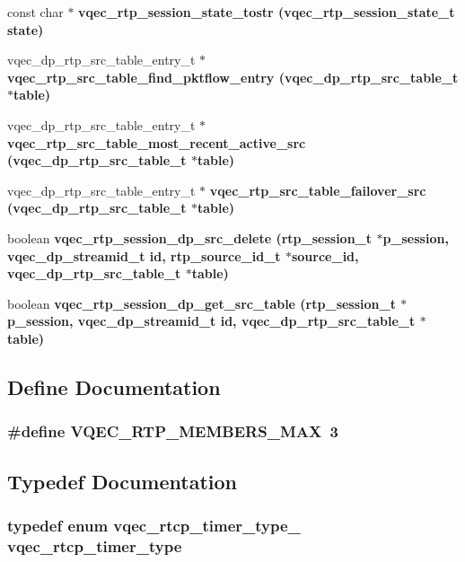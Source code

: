 \begin{CompactItemize}
const char $\ast$ \bf{vqec\_\-rtp\_\-session\_\-state\_\-tostr} (\bf{vqec\_\-rtp\_\-session\_\-state\_\-t} state)
\item 
vqec\_\-dp\_\-rtp\_\-src\_\-table\_\-entry\_\-t $\ast$ \bf{vqec\_\-rtp\_\-src\_\-table\_\-find\_\-pktflow\_\-entry} (vqec\_\-dp\_\-rtp\_\-src\_\-table\_\-t $\ast$table)
\item 
vqec\_\-dp\_\-rtp\_\-src\_\-table\_\-entry\_\-t $\ast$ \bf{vqec\_\-rtp\_\-src\_\-table\_\-most\_\-recent\_\-active\_\-src} (vqec\_\-dp\_\-rtp\_\-src\_\-table\_\-t $\ast$table)
\item 
vqec\_\-dp\_\-rtp\_\-src\_\-table\_\-entry\_\-t $\ast$ \bf{vqec\_\-rtp\_\-src\_\-table\_\-failover\_\-src} (vqec\_\-dp\_\-rtp\_\-src\_\-table\_\-t $\ast$table)
\item 
boolean \bf{vqec\_\-rtp\_\-session\_\-dp\_\-src\_\-delete} (rtp\_\-session\_\-t $\ast$p\_\-session, vqec\_\-dp\_\-streamid\_\-t id, rtp\_\-source\_\-id\_\-t $\ast$source\_\-id, vqec\_\-dp\_\-rtp\_\-src\_\-table\_\-t $\ast$table)
\item 
boolean \bf{vqec\_\-rtp\_\-session\_\-dp\_\-get\_\-src\_\-table} (rtp\_\-session\_\-t $\ast$p\_\-session, vqec\_\-dp\_\-streamid\_\-t id, vqec\_\-dp\_\-rtp\_\-src\_\-table\_\-t $\ast$table)
\end{CompactItemize}


\subsection{Define Documentation}
\subsubsection{\setlength{\rightskip}{0pt plus 5cm}\#define VQEC\_\-RTP\_\-MEMBERS\_\-MAX~3}\label{vqec__rtp_8h_01a067d8cbac5e22e0829c2bc2b554eb}




\subsection{Typedef Documentation}
\subsubsection{\setlength{\rightskip}{0pt plus 5cm}typedef enum \bf{vqec\_\-rtcp\_\-timer\_\-type\_\-}  \bf{vqec\_\-rtcp\_\-timer\_\-type}}\label{vqec__rtp_8h_d077812494418ba9420bb6bcd71302c5}


